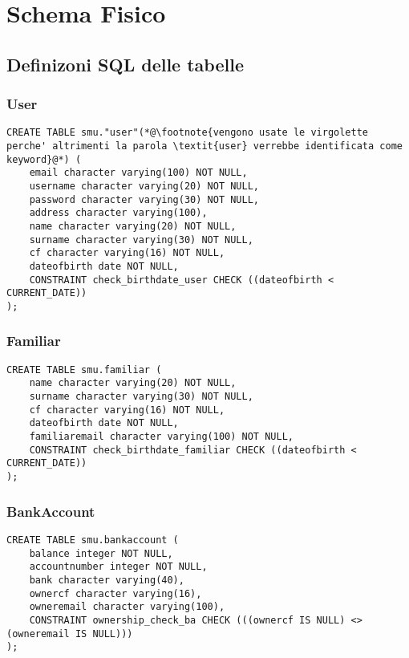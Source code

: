 \chapter{Schema Fisico}

\section{Definizoni SQL delle tabelle}

\subsection{User}

\begin{lstlisting}[tabsize=2]
CREATE TABLE smu."user"(*@\footnote{vengono usate le virgolette perche' altrimenti la parola \textit{user} verrebbe identificata come keyword}@*) (
    email character varying(100) NOT NULL,
    username character varying(20) NOT NULL,
    password character varying(30) NOT NULL,
    address character varying(100),
    name character varying(20) NOT NULL,
    surname character varying(30) NOT NULL,
    cf character varying(16) NOT NULL,
    dateofbirth date NOT NULL,
    CONSTRAINT check_birthdate_user CHECK ((dateofbirth < CURRENT_DATE))
);
\end{lstlisting}

\subsection{Familiar}

\begin{lstlisting}[tabsize=2]
CREATE TABLE smu.familiar (
    name character varying(20) NOT NULL,
    surname character varying(30) NOT NULL,
    cf character varying(16) NOT NULL,
    dateofbirth date NOT NULL,
    familiaremail character varying(100) NOT NULL,
    CONSTRAINT check_birthdate_familiar CHECK ((dateofbirth < CURRENT_DATE))
);
\end{lstlisting}

\newpage

\subsection{BankAccount}

\begin{lstlisting}[tabsize=2]
CREATE TABLE smu.bankaccount (
    balance integer NOT NULL,
    accountnumber integer NOT NULL,
    bank character varying(40),
    ownercf character varying(16),
    owneremail character varying(100),
    CONSTRAINT ownership_check_ba CHECK (((ownercf IS NULL) <> (owneremail IS NULL)))
);
\end{lstlisting}

